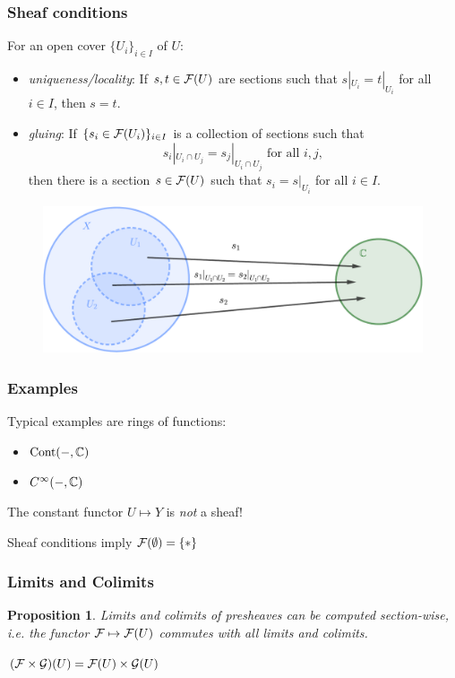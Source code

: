 \documentclass{beamer}
\newtheorem{proposition}{Proposition}
\DeclareMathOperator{\Cont}{Cont}
\begin{document}
\begin{frame}
    \frametitle{Sheaf conditions}

    For an open cover $\{U_i\}_{i\in I}$ of $U$:
    \begin{itemize}
        \item \emph{uniqueness/locality}: If $s,t\in \mathcal{F}(U)$ are sections such that
              $s|_{U_i} = t|_{U_i}$ for all $i\in I$, then $s=t$.
              \pause
        \item \emph{gluing}: If $\{s_i \in \mathcal{F}(U_i)\}_{i\in I}$ is
              a collection of sections such that
              \begin{equation*}
                  s_i|_{U_i \cap U_j} = s_j|_{U_i \cap U_j} \text { for all } i, j,
              \end{equation*}
              then there is a section $s\in \mathcal{F}(U)$ such that $s_i = s|_{U_i}$ for all $i \in I$.
    \end{itemize}
    \begin{figure}
        \centering
        \includegraphics[scale=0.3]{Sheaf_condition.pdf}
    \end{figure}

\end{frame}
\begin{frame}
    \frametitle{Examples}

    Typical examples are rings of functions:
    \begin{itemize}
        \item $\Cont(-, \bbC)$
        \item $C^\infty(-, \mathbb{C})$
    \end{itemize}
    \pause
    \medskip

    \medskip
    The constant functor $U \mapsto Y$ is \emph{not} a sheaf!

    Sheaf conditions imply $\mathcal{F}(\emptyset) = \{*\}$
\end{frame}

\begin{frame}
    \frametitle{Limits and Colimits}

    \begin{proposition}
        Limits and colimits of presheaves can be computed
        section-wise, i.e. the functor $\mathcal{F} \mapsto \mathcal{F}(U)$
        commutes with all limits and colimits.
    \end{proposition}

    \pause
    \begin{example}
        $(\mathcal{F}\times \mathcal{G} )(U) = \mathcal{F}(U) \times \mathcal{G}(U)$
    \end{example}

\end{frame}
\end{document}
